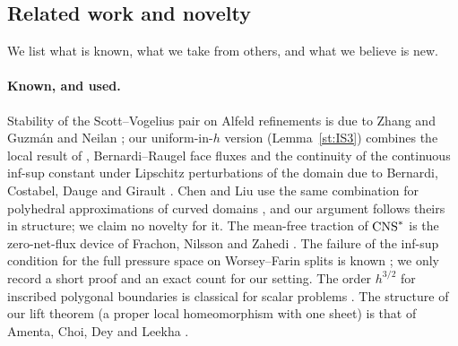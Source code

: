 \subsection{Related work and novelty}\label{sec:novelty}
We list what is known, what we take from others, and what we believe is new.

\paragraph{Known, and used.} Stability of the Scott--Vogelius pair on Alfeld refinements is due to Zhang \cite{Zhang2005} and Guzm\'an and Neilan \cite{GuzmanNeilan2018}; our uniform-in-$h$ version (Lemma~\ref{st:IS3}) combines the local result of \cite[Theorem~3.1]{GuzmanNeilan2018}, Bernardi--Raugel face fluxes \cite{BernardiRaugel1985} and the continuity of the continuous inf-sup constant under Lipschitz perturbations of the domain due to Bernardi, Costabel, Dauge and Girault \cite{BCDG2016}. Chen and Liu use the same combination for polyhedral approximations of curved domains \cite[Lemma~3.9]{ChenLiu2026}, and our argument follows theirs in structure; we claim no novelty for it. The mean-free traction of $\mathrm{CNS}^\ast$ is the zero-net-flux device of Frachon, Nilsson and Zahedi \cite{FrachonNilssonZahedi2024}. The failure of the inf-sup condition for the full pressure space on Worsey--Farin splits is known \cite{GuzmanLischkeNeilan2022,FabienGuzmanNeilanZytoon2022}; we only record a short proof and an exact count for our setting. The order $h^{3/2}$ for inscribed polygonal boundaries is classical for scalar problems \cite{BergerScottStrang1972,Scott1975}. The structure of our lift theorem (a proper local homeomorphism with one sheet) is that of Amenta, Choi, Dey and Leekha \cite{AmentaChoiDeyLeekha2000}.

